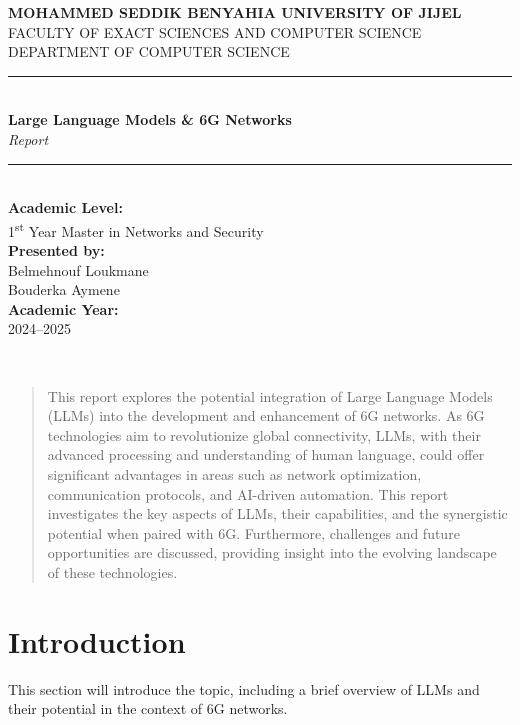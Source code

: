 \documentclass[12pt]{article}
\begin{document}
\thispagestyle{empty}
\begin{center}
    \textbf{\LARGE MOHAMMED SEDDIK BENYAHIA UNIVERSITY OF JIJEL}\\[0.5em]
    \Large FACULTY OF EXACT SCIENCES AND COMPUTER SCIENCE\\[0.5em]
    \Large DEPARTMENT OF COMPUTER SCIENCE\\[2em]

    \rule{\linewidth}{0.5mm}\\[1em]
    {\Huge \textbf{Large Language Models \& 6G Networks}}\\[0.5em]
    {\Large \textit{Report}}\\[0.8em]
    \rule{\linewidth}{0.5mm}\\[3em]

    \Large \textbf{Academic Level:}\\
    1\textsuperscript{st} Year Master in Networks and Security\\[3em]

    \Large \textbf{Presented by:}\\[0.5em]
    Belmehnouf Loukmane\\
    Bouderka Aymene\\[3em]

    \Large \textbf{Academic Year:}\\
    2024–2025
\end{center}

\newpage
\thispagestyle{empty}
~
\newpage

\newpage
\begin{abstract}
    This report explores the potential integration of Large Language Models (LLMs) into the development and enhancement of 6G networks. As 6G technologies aim to revolutionize global connectivity, LLMs, with their advanced processing and understanding of human language, could offer significant advantages in areas such as network optimization, communication protocols, and AI-driven automation. This report investigates the key aspects of LLMs, their capabilities, and the synergistic potential when paired with 6G. Furthermore, challenges and future opportunities are discussed, providing insight into the evolving landscape of these technologies.
\end{abstract}

\newpage
\tableofcontents
\newpage

\section{Introduction}
This section will introduce the topic, including a brief overview of LLMs and their potential in the context of 6G networks.
\end{document}
